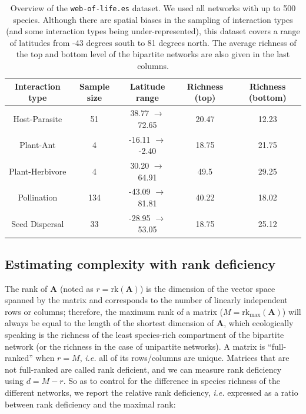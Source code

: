 \begin{table}[h!]
\centering
\begin{tabular}{||c c c c c||} 
 \hline
 Interaction type & Sample size & Latitude range & Richness (top) & Richness
 (bottom) \\ [0.5ex] \hline\hline
 Host-Parasite & 51 & 38.77 \(\rightarrow\) 72.65 & 20.47 & 12.23 \\ 
 Plant-Ant & 4 & -16.11 \(\rightarrow\) -2.40 & 18.75 & 21.75 \\
 Plant-Herbivore & 4 & 30.20 \(\rightarrow\) 64.91 & 49.5 & 29.25 \\
 Pollination & 134 & -43.09 \(\rightarrow\) 81.81 & 40.22 & 18.02 \\
 Seed Dispersal & 33 & -28.95 \(\rightarrow\) 53.05 & 18.75 & 25.12 \\ [1ex] 
 \hline
\end{tabular}
\caption{Overview of the \texttt{web-of-life.es} dataset. We used all networks
with up to 500 species. Although there are spatial biases in the sampling of
interaction types (and some interaction types being under-represented), this
dataset covers a range of latitudes from -43 degrees south to 81 degrees north.
The average richness of the top and bottom level of the bipartite networks are
also given in the last columns.}
\label{table:summary}
\end{table}

\subsection{Estimating complexity with rank
deficiency}\label{estimating-complexity-with-rank-deficiency}

The rank of \(\mathbf{A}\) (noted as \(r = \text{rk}(\mathbf{A})\)) is the
dimension of the vector space spanned by the matrix and corresponds to the
number of linearly independent rows or columns; therefore, the maximum rank of a
matrix (\(M = \text{rk}_{\text{max}}(\mathbf{A})\)) will always be equal to the
length of the shortest dimension of \(\mathbf{A}\), which ecologically speaking
is the richness of the least species-rich compartment of the bipartite network
(or the richness in the case of unipartite networks). A matrix is
``full-ranked'' when \(r=M\), \emph{i.e.} all of its rows/columns are unique.
Matrices that are not full-ranked are called rank deficient, and we can measure
rank deficiency using \(d = M-r\). So as to control for the difference in
species richness of the different networks, we report the relative rank
deficiency, \emph{i.e.} expressed as a ratio between rank deficiency and the
maximal rank:

